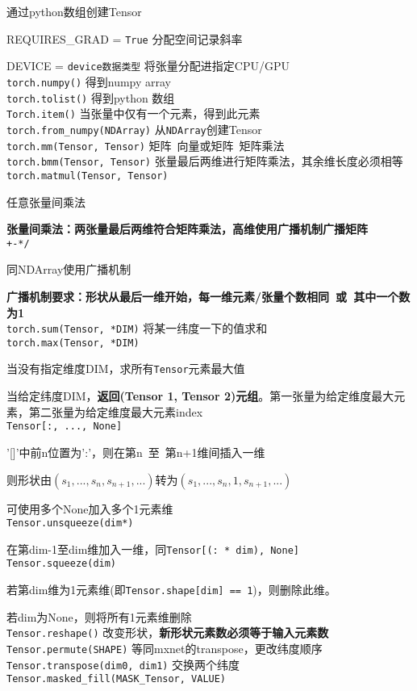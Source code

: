 \documentclass[UTF8]{ctexart}
\begin{document}
  通过python数组创建Tensor

  REQUIRES\_GRAD = \texttt{True} 分配空间记录斜率
  
  DEVICE = \texttt{device数据类型} 将张量分配进指定CPU/GPU\\
\texttt{torch.numpy()} 得到numpy array \\
\texttt{torch.tolist()} 得到python 数组 \\
\texttt{Torch.item()} 当张量中仅有一个元素，得到此元素 \\
\texttt{torch.from\_numpy(NDArray)} 从\texttt{NDArray}创建Tensor\\
\texttt{torch.mm(Tensor, Tensor)} 矩阵\ 向量或矩阵\ 矩阵乘法\\
\texttt{torch.bmm(Tensor, Tensor)} 张量最后两维进行矩阵乘法，其余维长度必须相等\\
\texttt{torch.matmul(Tensor, Tensor)} 

  任意张量间乘法
  
  \textbf{张量间乘法：两张量最后两维符合矩阵乘法，高维使用广播机制广播矩阵}\\
\texttt{+-*/} 

  同NDArray使用广播机制
  
  \textbf{广播机制要求：形状从最后一维开始，每一维元素/张量个数相同\ 或\ 其中一个数为1}\\
\texttt{torch.sum(Tensor, *DIM)} 将某一纬度一下的值求和\\
\texttt{torch.max(Tensor, *DIM)} 

  当没有指定维度DIM，求所有\texttt{Tensor}元素最大值
  
  当给定纬度DIM，\textbf{返回(Tensor 1, Tensor 2)元组}。第一张量为给定维度最大元素，第二张量为给定维度最大元素index\\
\texttt{Tensor[:, ..., None]} 
  
  '[]'中前n位置为':'，则在第n\ 至\ 第n+1维间插入一维

  则形状由$(s_1, ..., s_n, s_{n+1}, ...)$转为$(s_1, ..., s_n, 1, s_{n+1}, ...)$
  
  可使用多个None加入多个1元素维\\
\texttt{Tensor.unsqueeze(dim*)}

  在第dim-1至dim维加入一维，同\texttt{Tensor[(: * dim), None]}\\
\texttt{Tensor.squeeze(dim)}

  若第dim维为1元素维(即\texttt{Tensor.shape[dim] == 1})，则删除此维。

  若dim为None，则将所有1元素维删除\\
\texttt{Tensor.reshape()} 改变形状，\textbf{新形状元素数必须等于输入元素数}\\
\texttt{Tensor.permute(SHAPE)} 等同mxnet的transpose，更改纬度顺序\\
\texttt{Tensor.transpose(dim0, dim1)} 交换两个纬度\\
\texttt{Tensor.masked\_fill(MASK\_Tensor, VALUE)}
\end{document}
